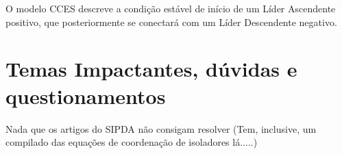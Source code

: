 \documentclass[a4paper, 12pt, onecolumn,singlespacing]{article}
\begin{document}
		O modelo CCES descreve a condição estável de início de um Líder Ascendente positivo, que posteriormente se conectará com um Líder Descendente negativo.
		
	\section{Temas Impactantes, dúvidas e questionamentos}
	
	Nada que os artigos do SIPDA não consigam resolver (Tem, inclusive, um compilado das equações de coordenação de isoladores lá.....) 
	
\end{document}
